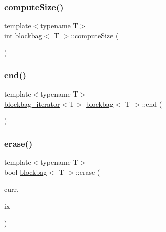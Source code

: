\mbox{\label{classblockbag_a8211033edefa32a954bd9b2fbe718498}} 
\subsubsection{\texorpdfstring{compute\+Size()}{computeSize()}}
{\footnotesize\ttfamily template$<$typename T$>$ \\
int \hyperlink{classblockbag}{blockbag}$<$ T $>$\+::compute\+Size (\begin{DoxyParamCaption}{ }\end{DoxyParamCaption})\hspace{0.3cm}{\ttfamily [inline]}}

\mbox{\label{classblockbag_a2b8c14d976119bb688ead024cd90fc16}} 
\subsubsection{\texorpdfstring{end()}{end()}}
{\footnotesize\ttfamily template$<$typename T$>$ \\
\hyperlink{classblockbag__iterator}{blockbag\+\_\+iterator}$<$T$>$ \hyperlink{classblockbag}{blockbag}$<$ T $>$\+::end (\begin{DoxyParamCaption}{ }\end{DoxyParamCaption})\hspace{0.3cm}{\ttfamily [inline]}}

\mbox{\label{classblockbag_ac9ef89b54e16c01853e9ba7fcc3eaad5}} 
\subsubsection{\texorpdfstring{erase()}{erase()}}
{\footnotesize\ttfamily template$<$typename T$>$ \\
bool \hyperlink{classblockbag}{blockbag}$<$ T $>$\+::erase (\begin{DoxyParamCaption}\item[{\hyperlink{classblock}{block}$<$ T $>$ $\ast$const}]{curr,  }\item[{const int}]{ix }\end{DoxyParamCaption})\hspace{0.3cm}{\ttfamily [inline]}}

